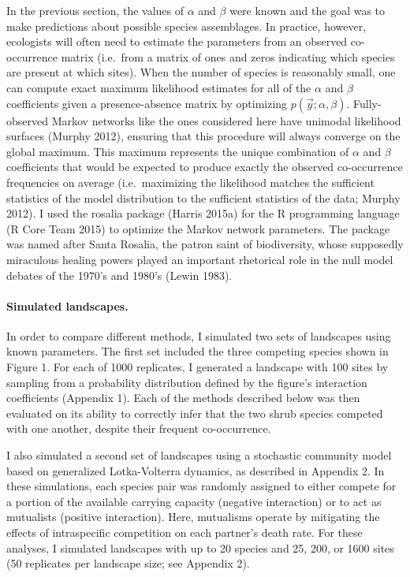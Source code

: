 \documentclass[12pt,]{article}
\begin{document}
\begin{spacing}{1.9}
\begin{flushleft}
In the previous section, the values of \(\alpha\) and \(\beta\) were
known and the goal was to make predictions about possible species
assemblages. In practice, however, ecologists will often need to
estimate the parameters from an observed co-occurrence matrix (i.e.~from
a matrix of ones and zeros indicating which species are present at which
sites). When the number of species is reasonably small, one can compute
exact maximum likelihood estimates for all of the \(\alpha\) and
\(\beta\) coefficients given a presence-absence matrix by optimizing
\(p(\vec{y}; \alpha, \beta)\). Fully-observed Markov networks like the
ones considered here have unimodal likelihood surfaces (Murphy 2012),
ensuring that this procedure will always converge on the global maximum.
This maximum represents the unique combination of \(\alpha\) and
\(\beta\) coefficients that would be expected to produce exactly the
observed co-occurrence frequencies on average (i.e.~maximizing the
likelihood matches the sufficient statistics of the model distribution
to the sufficient statistics of the data; Murphy 2012). I used the
rosalia package (Harris 2015a) for the R programming language (R Core
Team 2015) to optimize the Markov network parameters. The package was
named after Santa Rosalia, the patron saint of biodiversity, whose
supposedly miraculous healing powers played an important rhetorical role
in the null model debates of the 1970's and 1980's (Lewin 1983).

\paragraph{Simulated landscapes.}\label{simulated-landscapes.}

In order to compare different methods, I simulated two sets of
landscapes using known parameters. The first set included the three
competing species shown in Figure 1. For each of 1000 replicates, I
generated a landscape with 100 sites by sampling from a probability
distribution defined by the figure's interaction coefficients (Appendix
1). Each of the methods described below was then evaluated on its
ability to correctly infer that the two shrub species competed with one
another, despite their frequent co-occurrence.

I also simulated a second set of landscapes using a stochastic community
model based on generalized Lotka-Volterra dynamics, as described in
Appendix 2. In these simulations, each species pair was randomly
assigned to either compete for a portion of the available carrying
capacity (negative interaction) or to act as mutualists (positive
interaction). Here, mutualisms operate by mitigating the effects of
intraspecific competition on each partner's death rate. For these
analyses, I simulated landscapes with up to 20 species and 25, 200, or
1600 sites (50 replicates per landscape size; see Appendix 2).


\end{flushleft}
\end{spacing}
\end{document}

